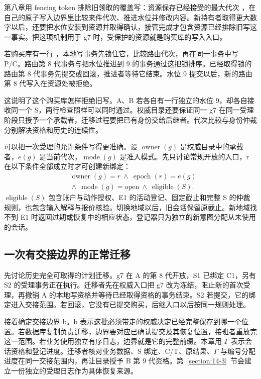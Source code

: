 第八章用 fencing token 排除旧领取的覆盖写：资源保存已经接受的最大代次 ，在自己的原子写入边界里比较来件代次、推进水位并修改内容。新持有者取得更大数字以后，还要把水位安装到资源并取得确认，接管完成才包含资源已经排除旧写这一事实。把这项机制用于 g7 时，受保护的资源就是购买库的写入入口。

若购买库有一行 ，本地写事务先锁住它，比较路由代次，再在同一事务中写 P/C。路由第 8 代事务与把水位推进到 9 的事务通过这把锁排序。已经取得锁的路由第 8 代事务先提交或回滚，推进者等待它结束。水位 9 提交以后，新的路由第 8 代写入在资源处被拒绝。


这说明了这个购买库怎样拒绝旧写。A、B 若各自有一行独立的水位 9，却各自接收同一个 S，两行检查照样可以同时通过。权威目录还要保证同一 g7 在同一受理阶段只授予一个承载者，迁移过程要把已有身份交给后继者。代次比较与身份仲裁分别解决资格和历史的连续性。

可以把一次受理的允许条件写得更准确。设 $\operatorname{owner}(g)$ 是权威目录中的承载者，$e(g)$ 是当前代次，$\operatorname{mode}(g)$ 是准入模式。先只讨论常规开放的入口，r 在以下条件全部成立时才可创建新绑定：
\[
\begin{split}
&\operatorname{owner}(g)=r\ \land\ \operatorname{epoch}(r)=e(g)\\
&{}\land\ \operatorname{mode}(g)=\mathrm{open}\ \land\ \operatorname{eligible}(S).
\end{split}
\]
$\operatorname{eligible}(S)$ 包含账户与动作授权、E1 的活动登记、固定截止和完整 S 的仲裁规则，也包含输入解释与报价核验。切换地域以后，旧会话保留原截止。新地域找不到 E1 时返回过期或恢复中的相应状态，登记器只为独立的新意图分配从未使用的会话。

\subsection*{一次有交接边界的正常迁移}

先讨论历史完全可取得的计划迁移。g7 在 A 的第 8 代开放，S1 已绑定 C1，另有 S2 的受理事务正在执行。迁移者先在权威入口把 g7 改为冻结，阻止新的首次受理，再撤销 A 的本地写资格并等待已经取得资格的事务结束。S2 若提交，它的绑定进入交接范围。若回滚，它没有已提交购买，后继入口以后按同一规则处理。

接着确定交接边界 b。b 表示这批必须带走的权威决定已经完整保存到哪一个位置。若数据库复制负责迁移，边界要对应已确认提交及其恢复位置，接班者重放完这一范围。若业务使用独立有序日志，边界就是它的完整前缀。本章用 $\Gamma$ 表示会话资格和登记进度。迁移者核对业务数据、S 绑定、C/T、原结果、$\Gamma$ 与编号分配进度在同一交接范围内，再让目录授予 B 第 9 代资格。第~\ref{section:14-3}~节会建立一份独立的受理日志作为具体恢复来源。

